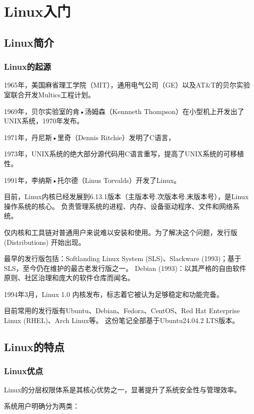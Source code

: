 \section{Linux入门}

\subsection{Linux简介}

\subsubsection{Linux的起源}

1965年，美国麻省理工学院（MIT），通用电气公司（GE）以及AT\&T的贝尔实验室联合开发Multics工程计划。

1969年，贝尔实验室的肯•汤姆森（Kennneth Thompson）在小型机上开发出了UNIX系统，1970年发布。

1971年，丹尼斯•里奇（Dennis Ritchie）发明了C语言，

1973年，UNIX系统的绝大部分源代码用C语言重写，提高了UNIX系统的可移植性。

1991年，李纳斯•托尔德（Linus Torvalds）开发了Linux。

目前，Linux内核已经发展到6.13.1版本（主版本号.次版本号.末版本号），是Linux操作系统的核心。
负责管理系统的进程、内存、设备驱动程序、文件和网络系统。

仅内核和工具链对普通用户来说难以安装和使用。为了解决这个问题，发行版 (Distributions) 开始出现。

最早的发行版包括：Softlanding Linux System (SLS)、Slackware (1993)；基于 SLS，至今仍在维护的最古老发行版之一。
Debian (1993)：以其严格的自由软件原则、社区治理和庞大的软件仓库而闻名。

1994年3月，Linux 1.0 内核发布，标志着它被认为足够稳定和功能完备。

目前常用的发行版有Ubuntu、Debian、Fedora、CentOS、Red Hat Enterprise Linux (RHEL)、Arch Linux等。
这份笔记全部基于Ubuntu24.04.2 LTS版本。

\subsection{Linux的特点}
\subsubsection{Linux优点}
Linux的分层权限体系是其核心优势之一，显著提升了系统安全性与管理效率。

系统用户明确分为两类：

